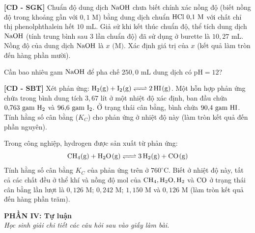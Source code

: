 \documentclass[12pt,a4paper]{article}
\begin{document}
\begin{ex}
\textbf{[CD - SGK]} Chuẩn độ dung dịch $\ce{NaOH}$ chưa biết chính xác nồng độ (biết nồng độ trong khoảng gần với $0{,}1\text{ M}$) bằng dung dịch chuẩn $\ce{HCl}\ 0{,}1\text{ M}$ với chất chỉ thị phenolphthalein hết $10\text{ mL}$. Giả sử khi kết thúc chuẩn độ, thể tích dung dịch $\ce{NaOH}$ (tính trung bình sau 3 lần chuẩn độ) đã sử dụng ở burette là $10{,}27\text{ mL}$. Nồng độ của dung dịch $\ce{NaOH}$ là $x\text{ (M)}$. Xác định giá trị của $x$ (kết quả làm tròn đến hàng phần mười).

\vspace{1.2cm}

\end{ex}

\begin{ex}
Cần bao nhiêu gam $\ce{NaOH}$ để pha chế $250{,}0\text{ mL}$ dung dịch có $\text{pH} = 12$?

\vspace{1.2cm}

\end{ex}

\begin{ex}
\textbf{[CD - SBT]} Xét phản ứng: $\ce{H2(g) + I2(g) <=> 2HI(g)}$. Một hỗn hợp phản ứng chứa trong bình dung tích $3{,}67\text{ lít}$ ở một nhiệt độ xác định, ban đầu chứa $0{,}763\text{ gam } \ce{H2}$ và $96{,}6\text{ gam } \ce{I2}$. Ở trạng thái cân bằng, bình chứa $90{,}4\text{ gam } \ce{HI}$. Tính hằng số cân bằng ($K_C$) cho phản ứng ở nhiệt độ này (làm tròn kết quả đến phần nguyên).

\vspace{1.2cm}

\end{ex}

\begin{ex}
Trong công nghiệp, hydrogen được sản xuất từ phản ứng:
\[\ce{CH4(g) + H2O(g) <=> 3H2(g) + CO(g)}\]
Tính hằng số cân bằng $K_C$ của phản ứng trên ở $760^\circ\text{C}$. Biết ở nhiệt độ này, tất cả các chất đều ở thể khí và nồng độ mol của $\ce{CH4, H2O, H2}$ và $\ce{CO}$ ở trạng thái cân bằng lần lượt là $0{,}126\text{ M}$; $0{,}242\text{ M}$; $1{,}150\text{ M}$ và $0{,}126\text{ M}$ (làm tròn kết quả đến hàng phần trăm).

\vspace{1.2cm}

\end{ex}

\bigskip
\noindent
\textbf{PHẦN IV: Tự luận}\\
\textit{Học sinh giải chi tiết các câu hỏi sau vào giấy làm bài.}
\end{document}

